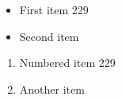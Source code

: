 \documentclass{article}
\begin{document}
\begin{itemize}
\item First item 229
\item Second item
\end{itemize}
\begin{enumerate}
\item Numbered item 229
\item Another item
\end{enumerate}
\end{document}
